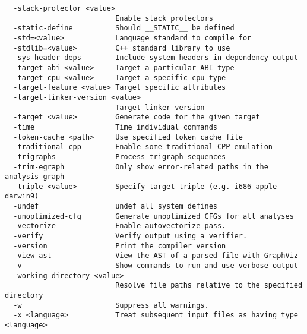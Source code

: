 \begin{verbatim}
  -stack-protector <value>
                          Enable stack protectors
  -static-define          Should __STATIC__ be defined
  -std=<value>            Language standard to compile for
  -stdlib=<value>         C++ standard library to use
  -sys-header-deps        Include system headers in dependency output
  -target-abi <value>     Target a particular ABI type
  -target-cpu <value>     Target a specific cpu type
  -target-feature <value> Target specific attributes
  -target-linker-version <value>
                          Target linker version
  -target <value>         Generate code for the given target
  -time                   Time individual commands
  -token-cache <path>     Use specified token cache file
  -traditional-cpp        Enable some traditional CPP emulation
  -trigraphs              Process trigraph sequences
  -trim-egraph            Only show error-related paths in the analysis graph
  -triple <value>         Specify target triple (e.g. i686-apple-darwin9)
  -undef                  undef all system defines
  -unoptimized-cfg        Generate unoptimized CFGs for all analyses
  -vectorize              Enable autovectorize pass.
  -verify                 Verify output using a verifier.
  -version                Print the compiler version
  -view-ast               View the AST of a parsed file with GraphViz
  -v                      Show commands to run and use verbose output
  -working-directory <value>
                          Resolve file paths relative to the specified directory
  -w                      Suppress all warnings.
  -x <language>           Treat subsequent input files as having type <language>

\end{verbatim}


